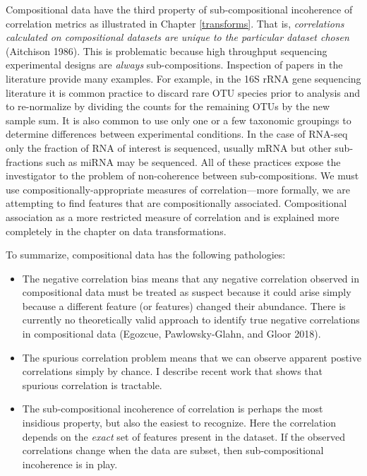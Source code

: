 \documentclass[onecolumn]{article}
\begin{document}
Compositional data have the third property of sub-compositional incoherence of correlation metrics as illustrated in Chapter \ref{transforms}. That is, \emph{correlations calculated on compositional datasets are unique to the particular dataset chosen} (Aitchison 1986). This is problematic because high throughput sequencing experimental designs are \emph{always} sub-compositions. Inspection of papers in the literature provide many examples. For example, in the 16S rRNA gene sequencing literature it is common practice to discard rare OTU species prior to analysis and to re-normalize by dividing the counts for the remaining OTUs by the new sample sum. It is also common to use only one or a few taxonomic groupings to determine differences between experimental conditions. In the case of RNA-seq only the fraction of RNA of interest is sequenced, usually mRNA but other sub-fractions such as miRNA may be sequenced. All of these practices expose the investigator to the problem of non-coherence between sub-compositions. We must use compositionally-appropriate measures of correlation---more formally, we are attempting to find features that are compositionally associated. Compositional association as a more restricted measure of correlation and is explained more completely in the chapter on data transformations.

To summarize, compositional data has the following pathologies:

\begin{itemize}
\item
  The negative correlation bias means that any negative correlation observed in compositional data must be treated as suspect because it could arise simply because a different feature (or features) changed their abundance. There is currently no theoretically valid approach to identify true negative correlations in compositional data (Egozcue, Pawlowsky-Glahn, and Gloor 2018).
\item
  The spurious correlation problem means that we can observe apparent postive correlations simply by chance. I describe recent work that shows that spurious correlation is tractable.
\item
  The sub-compositional incoherence of correlation is perhaps the most insidious property, but also the easiest to recognize. Here the correlation depends on the \emph{exact} set of features present in the dataset. If the observed correlations change when the data are subset, then sub-compositional incoherence is in play.
\end{itemize}
\end{document}
